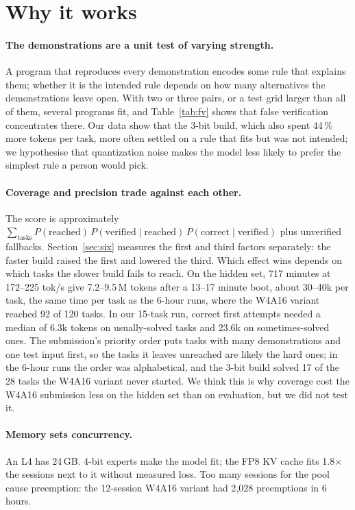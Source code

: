\documentclass[11pt]{article}
\begin{document}
\section{Why it works}
\paragraph{The demonstrations are a unit test of varying strength.} A program that reproduces every demonstration encodes some rule that explains them; whether it is the intended rule depends on how many alternatives the demonstrations leave open. With two or three pairs, or a test grid larger than all of them, several programs fit, and Table~\ref{tab:fv} shows that false verification concentrates there. Our data show that the 3-bit build, which also spent 44\,\% more tokens per task, more often settled on a rule that fits but was not intended; we hypothesise that quantization noise makes the model less likely to prefer the simplest rule a person would pick.

\paragraph{Coverage and precision trade against each other.} The score is approximately $\sum_{\text{tasks}} P(\text{reached})\,P(\text{verified}\mid\text{reached})\,P(\text{correct}\mid\text{verified})$ plus unverified fallbacks. Section~\ref{sec:six} measures the first and third factors separately: the faster build raised the first and lowered the third. Which effect wins depends on which tasks the slower build fails to reach. On the hidden set, 717 minutes at 172--225 tok/s give 7.2--9.5\,M tokens after a 13--17 minute boot, about 30--40k per task, the same time per task as the 6-hour runs, where the W4A16 variant reached 92 of 120 tasks. In our 15-task run, correct first attempts needed a median of 6.3k tokens on usually-solved tasks and 23.6k on sometimes-solved ones. The submission's priority order puts tasks with many demonstrations and one test input first, so the tasks it leaves unreached are likely the hard ones; in the 6-hour runs the order was alphabetical, and the 3-bit build solved 17 of the 28 tasks the W4A16 variant never started. We think this is why coverage cost the W4A16 submission less on the hidden set than on evaluation, but we did not test it.

\paragraph{Memory sets concurrency.} An L4 has 24\,GB. 4-bit experts make the model fit; the FP8 KV cache fits 1.8$\times$ the sessions next to it without measured loss. Too many sessions for the pool cause preemption: the 12-session W4A16 variant had 2{,}028 preemptions in 6 hours.
\end{document}
